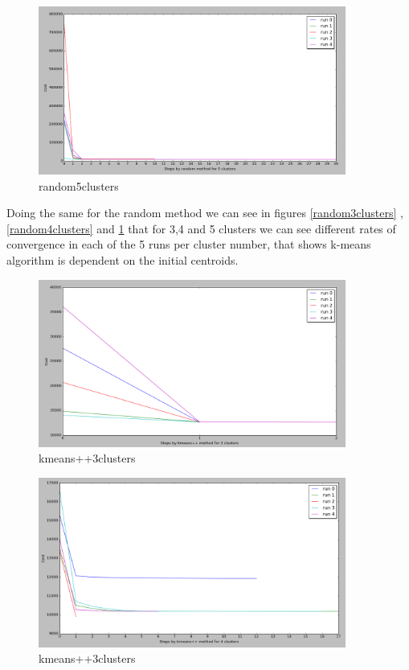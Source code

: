 \begin{figure}[!htb]
\centering
\includegraphics[width=0.9\textwidth]{shots/random5clusters.png}
\caption{ random5clusters}
\label{random5clusters}
\end{figure}


Doing the same for the random method we can see in figures \ref{random3clusters} , \ref{random4clusters} and \ref{random5clusters} that for 3,4 and 5 clusters we can see different rates of convergence in each of the 5 runs per cluster number, that shows k-means algorithm is dependent on the initial centroids.

\begin{figure}[!htb]
\centering
\includegraphics[width=0.9\textwidth]{shots/kmeans++3clusters.png}
\caption{kmeans++3clusters }
\label{kmeans++3clusters}
\end{figure}



\begin{figure}[!htb]
\centering
\includegraphics[width=0.9\textwidth]{shots/kmeans++4clusters.png}
\caption{kmeans++3clusters }
\label{kmeans++4clusters}
\end{figure}


